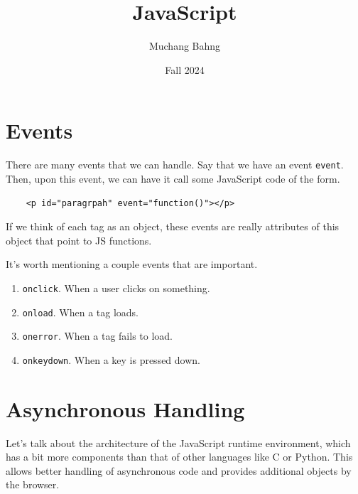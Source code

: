 \documentclass{article}
\newcounter{example}[section]
\newcounter{code}[section]
\begin{document}
\title{JavaScript}
\author{Muchang Bahng}
\date{Fall 2024}

\maketitle
\tableofcontents
\pagebreak

\section{Events} 
  
  There are many events that we can handle. Say that we have an event \texttt{event}. Then, upon this event, we can have it call some JavaScript code of the form. 
  \begin{lstlisting}
    <p id="paragrpah" event="function()"></p>
  \end{lstlisting}

  If we think of each tag as an object, these events are really attributes of this object that point to JS functions. 
 
  \begin{example}
    \label{ex:significant-events}
    It's worth mentioning a couple events that are important. 
    \begin{enumerate}
      \item \texttt{onclick}. When a user clicks on something. 
      \item \texttt{onload}. When a tag loads. 
      \item \texttt{onerror}. When a tag fails to load.  
      \item \texttt{onkeydown}. When a key is pressed down. 
    \end{enumerate}
  \end{example}

\section{Asynchronous Handling}

  Let's talk about the architecture of the JavaScript runtime environment, which has a bit more components than that of other languages like C or Python. This allows better handling of asynchronous code and provides additional objects by the browser.  
\end{document}
